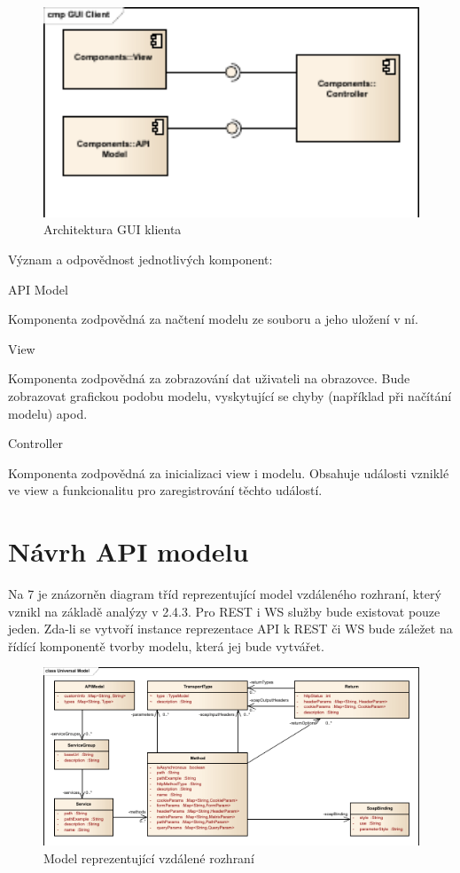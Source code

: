 \documentclass[11pt,twoside,a4paper]{book}
\begin{document}
\begin{figure}[h]
\begin{center}
\includegraphics[width=13cm]{images-pdf/GUI-Client.pdf}
\caption{Architektura GUI klienta}
\label{fig:logo}
\end{center}
\end{figure}

Význam a odpovědnost jednotlivých komponent:

API Model

Komponenta zodpovědná za načtení modelu ze souboru a jeho uložení v ní.

View

Komponenta zodpovědná za zobrazování dat uživateli na obrazovce. Bude zobrazovat
grafickou podobu modelu, vyskytující se chyby (například při načítání modelu) apod.

Controller

Komponenta zodpovědná za inicializaci view i modelu. Obsahuje události vzniklé ve view a
funkcionalitu pro zaregistrování těchto událostí.

\section{Návrh API modelu}

Na 7 je znázorněn diagram tříd reprezentující model vzdáleného rozhraní, který vznikl na
základě analýzy v 2.4.3. Pro REST i WS služby bude existovat pouze jeden. Zda-li se vytvoří
instance reprezentace API k REST či WS bude záležet na řídící komponentě tvorby modelu,
která jej bude vytvářet.

\begin{figure}[h]
\begin{center}
\includegraphics[width=13cm]{images-pdf/Universal-Model.pdf}
\caption{Model reprezentující vzdálené rozhraní}
\label{fig:logo}
\end{center}
\end{figure}
\end{document}
